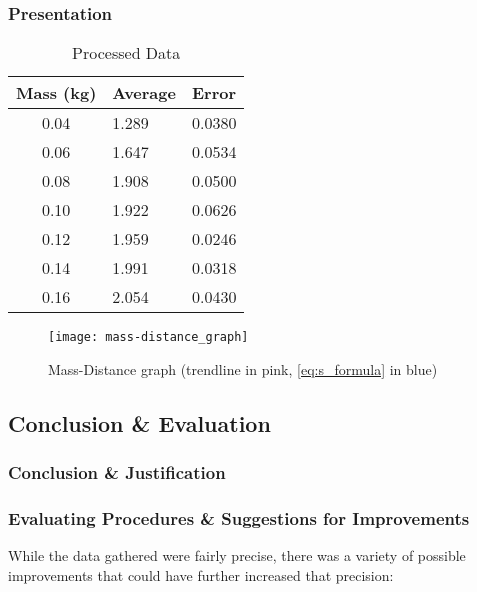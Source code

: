 \documentclass[titlepage,12pt]{article}
\begin{document}
        \subsubsection{Presentation}
            \FloatBarrier
            \begin{table}[H]
                \centering
                \def\arraystretch{1.5}
                \begin{tabularx}{\textwidth}{c|X|X}
                    Mass (kg) & Average & Error\\ 
                    \hline
                    \hline
                    0.04 & 1.289 & 0.0380\\ 
                    \hline
                    0.06 & 1.647 & 0.0534\\ 
                    \hline
                    0.08 & 1.908 & 0.0500\\ 
                    \hline
                    0.10 & 1.922 & 0.0626\\ 
                    \hline
                    0.12 & 1.959 & 0.0246\\ 
                    \hline
                    0.14 & 1.991 & 0.0318\\ 
                    \hline
                    0.16 & 2.054 & 0.0430\\ 
                \end{tabularx}
                \caption{Processed Data} 
                \label{table:processed data}
            \end{table}

            \begin{figure}[H]
                \label{fig:mass-distance-graph}
                \centering
                \texttt{[image: mass-distance\_graph]}
                \caption{Mass-Distance graph (trendline in pink, 
                    \autoref{eq:s_formula} in blue)}
            \end{figure}
    
            \FloatBarrier

    \subsection{Conclusion \& Evaluation}
        \subsubsection{Conclusion \& Justification}
        \subsubsection{Evaluating Procedures \& Suggestions for Improvements}
            While the data gathered were fairly precise, there was a variety of
            possible improvements that could have further increased that
            precision:
        
\end{document}
